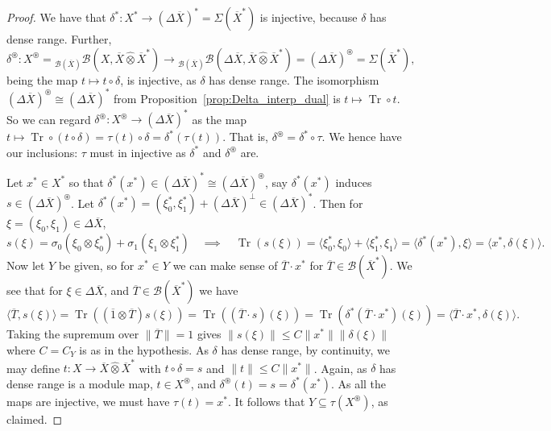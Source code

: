 \documentclass[a4paper,11pt]{article}
\theoremstyle{plain}
\theoremstyle{remark}
\newcommand{\mc}[1]{\mathcal{#1}}
\newcommand{\ip}[2]{{\langle {#1} , {#2} \rangle}}
\newcommand{\proten}{\widehat\otimes}
\newcommand{\intdual}{\circledast}
\newcommand{\tr}{\operatorname{Tr}}
\begin{document}
\begin{proof}
We have that $\delta^* \colon X^* \to (\Delta\overline X)^* = \Sigma(\overline X^*)$ is injective, because $\delta$ has dense range.  Further,
\[ \delta^\intdual \colon
X^\intdual = {}_{\mc B(\overline X)}\mc B(X, \overline X \proten \overline X^*)
\to
{}_{\mc B(\overline X)}\mc B(\Delta\overline X, \overline X \proten \overline X^*) = (\Delta\overline X)^\intdual = \Sigma(\overline X^*), \]
being the map $t\mapsto t\circ \delta$, is injective, as $\delta$ has dense range.
The isomorphism $(\Delta\overline X)^\intdual \cong (\Delta\overline X)^*$ from Proposition~\ref{prop:Delta_interp_dual} is $t \mapsto \tr\circ t$.  So we can regard $\delta^\intdual \colon X^\intdual \to (\Delta\overline X)^*$ as the map $t \mapsto \tr\circ(t\circ \delta) = \tau (t) \circ \delta = \delta^*(\tau(t))$.  That is, $\delta^\intdual = \delta^* \circ \tau$.  We hence have our inclusions: $\tau$ must in injective as $\delta^*$ and $\delta^\intdual$ are.

Let $x^*\in X^*$ so that $\delta^*(x^*)\in (\Delta\overline X)^* \cong (\Delta\overline X)^\intdual$, say $\delta^*(x^*)$ induces $s\in (\Delta\overline X)^\intdual$.  Let $\delta^*(x^*) = (\xi_0^*, \xi_1^*) + (\Delta\overline X)^\perp \in (\Delta\overline X)^*$.  Then for $\xi=(\xi_0,\xi_1)\in\Delta\overline X$,
\[ s(\xi) = \sigma_0(\xi_0\otimes\xi_0^*) + \sigma_1(\xi_1\otimes\xi_1^*)
\quad\implies\quad
\tr(s(\xi)) = \ip{\xi_0^*}{\xi_0} + \ip{\xi_1^*}{\xi_1} = \ip{\delta^*(x^*)}{\xi}
= \ip{x^*}{\delta(\xi)}. \]
Now let $Y$ be given, so for $x^*\in Y$ we can make sense of $\overline T\cdot x^*$ for $\overline T\in\mc B(\overline X^*)$.  We see that for $\xi\in\Delta\overline X$, and $\overline T\in\mc B(\overline X^*)$ we have
\[ \ip{\overline T}{s(\xi)}
= \tr((\overline 1\otimes\overline T)s(\xi))
= \tr( (\overline T \cdot s)(\xi) )
= \tr( \delta^*(\overline T\cdot x^*)(\xi) )
= \ip{\overline T\cdot x^*}{\delta(\xi)}. \]
Taking the supremum over $\|\overline T\| = 1$ gives $\|s(\xi)\| \leq C \|x^*\| \|\delta(\xi)\|$ where $C=C_Y$ is as in the hypothesis.  As $\delta$ has dense range, by continuity, we may define $t \colon X \to \overline X\proten\overline X^*$ with $t\circ\delta = s$ and $\|t\| \leq C\|x^*\|$.  Again, as $\delta$ has dense range is a module map, $t\in X^\intdual$, and $\delta^\intdual(t) = s = \delta^*(x^*)$.  As all the maps are injective, we must have $\tau(t) = x^*$.  It follows that $Y \subseteq \tau(X^\intdual)$, as claimed.


\end{proof}
\end{document}
